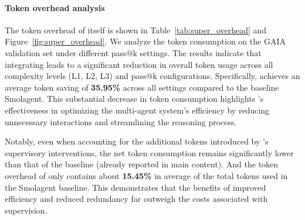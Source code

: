 \paragraph{Token overhead analysis}
The token overhead of \method itself is shown in Table~\ref{tab:super_overhead} and Figure~\ref{fig:super_overhead}. We analyze the token consumption on the GAIA validation set under different pass@k settings. The results indicate that integrating \method leads to a significant reduction in overall token usage across all complexity levels (L1, L2, L3) and pass@k configurations. Specifically, \method achieves an average token saving of \textbf{35.95\%} across all settings compared to the baseline Smolagent. This substantial decrease in token consumption highlights \method's effectiveness in optimizing the multi-agent system's efficiency by reducing unnecessary interactions and streamlining the reasoning process.

Notably, even when accounting for the additional tokens introduced by \method's supervisory interventions, the net token consumption remains significantly lower than that of the baseline (already reported in main content). 
And the token overhead of \method only contains about \textbf{15.45\%} in average of the total tokens used in the Smolagent baseline.
This demonstrates that the benefits of improved efficiency and reduced redundancy far outweigh the costs associated with supervision.

